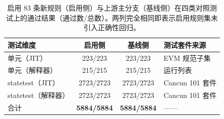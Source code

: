 \begin{table}[t]
\centering
\caption{启用 83 条新规则（启用侧）与上游主分支（基线侧）在四类对照测试上的通过结果（通过数/总数）。两列完全相同即表示启用规则集未引入正确性回归。}
\label{tab:correctness}
\footnotesize
\setlength{\tabcolsep}{3pt}
\begin{tabular}{@{}l c c p{1.9cm}@{}}
\toprule
测试维度 & 启用侧 & 基线侧 & 测试套件来源 \\
\midrule
单元（JIT）     & 223/223   & 223/223   & EVM 规范子集 \\
单元（解释器）  & 215/215   & 215/215   & 运行列表 \\
statetest（JIT） & 2723/2723 & 2723/2723 & Cancun 101 套件 \\
statetest（解释器） & 2723/2723 & 2723/2723 & Cancun 101 套件 \\
\midrule
合计 & \textbf{5884/5884} & \textbf{5884/5884} & —— \\
\bottomrule
\end{tabular}
\end{table}

